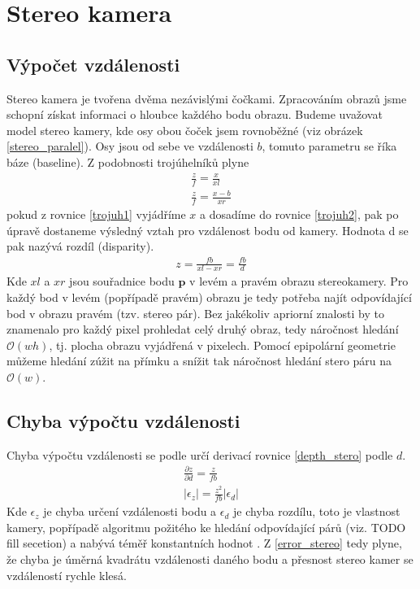 \documentclass[twoside]{ctuthesis}
\newcommand{\tl}[1]{$\mathbf{#1}$}
\begin{document}
\section{Stereo kamera}
\subsection{Výpočet vzdálenosti}
Stereo kamera je tvořena dvěma nezávislými čočkami. Zpracováním obrazů jsme schopní získat informaci o hloubce každého bodu obrazu. Budeme uvažovat model stereo kamery, kde osy obou čoček jsem rovnoběžné (viz obrázek \ref{stereo_paralel}). Osy jsou od sebe ve vzdálenosti $b$, tomuto parametru se říka báze (baseline). Z podobnosti trojúhelníků plyne
\begin{align}
    \frac{z}{f} = \frac{x}{xl} \label{trojuh1} \\
    \frac{z}{f} = \frac{x - b}{xr} \label{trojuh2}
\end{align}
pokud z rovnice \ref{trojuh1} vyjádříme $x$ a dosadíme do rovnice \ref{trojuh2}, pak po úpravě dostaneme výsledný vztah pro vzdálenost bodu od kamery. Hodnota d se pak nazývá rozdíl (disparity).
\begin{align}
    z = \frac{fb}{xl - xr} = \frac{fb}{d} 
    \label{depth_stero}
\end{align}
Kde $xl$ a $xr$ jsou souřadnice bodu \tl{p} v levém a pravém obrazu stereokamery. Pro každý bod v levém (popřípadě pravém) obrazu je tedy potřeba najít odpovídající bod v obrazu pravém (tzv. stereo pár). Bez jakékoliv apriorní znalosti by to znamenalo pro každý pixel prohledat celý druhý obraz, tedy náročnost hledání $\mathcal{O}(wh)$, tj. plocha obrazu vyjádřená v pixelech. Pomocí epipolární geometrie můžeme hledání zúžit na přímku  a snížit tak náročnost hledání stero páru na $\mathcal{O}(w)$. \cite{brown2003advances_in_stereo}

\subsection{Chyba výpočtu vzdálenosti}
Chyba výpočtu vzdálenosti se podle \cite{keselman2017intel} určí derivací rovnice \ref{depth_stero} podle $d$.
\begin{align}
    \frac{\partial z}{\partial d} = \frac{z}{fb} \\
    |\epsilon_z | = \frac{z^2}{fb}|\epsilon_d |
    \label{error_stereo}
\end{align}
Kde $\epsilon_z $ je chyba určení vzdálenosti bodu a $ \epsilon_d $ je chyba rozdílu, toto je vlastnost kamery, popřípadě algoritmu požitého ke hledání odpovídající párů (viz. TODO fill secetion) a nabývá téměř konstantních hodnot \cite{keselman2017intel}. Z \ref{error_stereo} tedy plyne, že chyba je úměrná kvadrátu vzdálenosti daného bodu a přesnost stereo kamer se vzdáleností rychle klesá.
\end{document}
